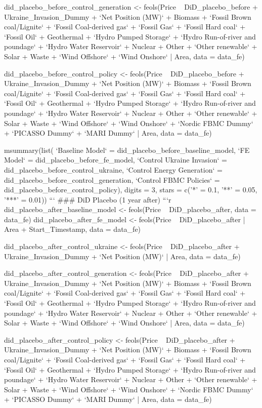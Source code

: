 did_placebo_before_control_generation <- feols(Price ~ DiD_placebo_before + Ukraine_Invasion_Dummy + `Net Position (MW)` + Biomass + `Fossil Brown coal/Lignite` + `Fossil Coal-derived gas` + `Fossil Gas` + `Fossil Hard coal` + `Fossil Oil` + Geothermal + `Hydro Pumped Storage` + `Hydro Run-of-river and poundage` + `Hydro Water Reservoir` + Nuclear + Other + `Other renewable` + Solar + Waste + `Wind Offshore` + `Wind Onshore` | Area, data = data_fe)

did_placebo_before_control_policy <- feols(Price ~ DiD_placebo_before + Ukraine_Invasion_Dummy + `Net Position (MW)` + Biomass + `Fossil Brown coal/Lignite` + `Fossil Coal-derived gas` + `Fossil Gas` + `Fossil Hard coal` + `Fossil Oil` + Geothermal + `Hydro Pumped Storage` + `Hydro Run-of-river and poundage` + `Hydro Water Reservoir` + Nuclear + Other + `Other renewable` + Solar + Waste + `Wind Offshore` + `Wind Onshore` + `Nordic FBMC Dummy` + `PICASSO Dummy` + `MARI Dummy` | Area, data = data_fe)

msummary(list(
    `Baseline Model` = did_placebo_before_baseline_model,
    `FE Model` = did_placebo_before_fe_model,
    `Control Ukraine Invasion` = did_placebo_before_control_ukraine,
    `Control Energy Generation` = did_placebo_before_control_generation,
    `Control FBMC Policies` = did_placebo_before_control_policy),
  digits = 3,
  stars = c('*' = 0.1, '**' = 0.05, '***' = 0.01))
```
### DiD Placebo (1 year after)
```{r}
did_placebo_after_baseline_model <- feols(Price ~ DiD_placebo_after, data = data_fe)
did_placebo_after_fe_model <- feols(Price ~ DiD_placebo_after | Area + Start_Timestamp, data = data_fe)

did_placebo_after_control_ukraine <- feols(Price ~ DiD_placebo_after + Ukraine_Invasion_Dummy + `Net Position (MW)` | Area, data = data_fe)

did_placebo_after_control_generation <- feols(Price ~ DiD_placebo_after + Ukraine_Invasion_Dummy + `Net Position (MW)` + Biomass + `Fossil Brown coal/Lignite` + `Fossil Coal-derived gas` + `Fossil Gas` + `Fossil Hard coal` + `Fossil Oil` + Geothermal + `Hydro Pumped Storage` + `Hydro Run-of-river and poundage` + `Hydro Water Reservoir` + Nuclear + Other + `Other renewable` + Solar + Waste + `Wind Offshore` + `Wind Onshore` | Area, data = data_fe)

did_placebo_after_control_policy <- feols(Price ~ DiD_placebo_after + Ukraine_Invasion_Dummy + `Net Position (MW)` + Biomass + `Fossil Brown coal/Lignite` + `Fossil Coal-derived gas` + `Fossil Gas` + `Fossil Hard coal` + `Fossil Oil` + Geothermal + `Hydro Pumped Storage` + `Hydro Run-of-river and poundage` + `Hydro Water Reservoir` + Nuclear + Other + `Other renewable` + Solar + Waste + `Wind Offshore` + `Wind Onshore` + `Nordic FBMC Dummy` + `PICASSO Dummy` + `MARI Dummy` | Area, data = data_fe)


